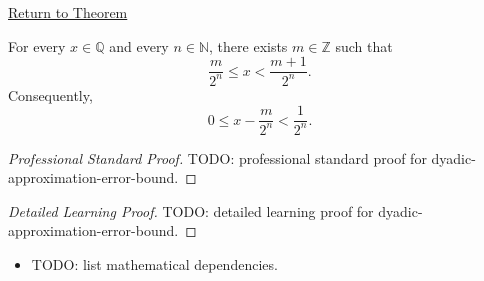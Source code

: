 \newpage
{}
\label{prf:dyadic-approximation-error-bound}

\begin{remark*}[Return]
\hyperref[thm:dyadic-approximation-error-bound]{Return to Theorem}
\end{remark*}

\begin{theorem*}
For every $x\in\mathbb{Q}$ and every $n\in\mathbb{N}$, there exists
$m\in\mathbb{Z}$ such that
\[
\frac{m}{2^n}\le x<\frac{m+1}{2^n}.
\]
Consequently,
\[
0\le x-\frac{m}{2^n}<\frac{1}{2^n}.
\]
\end{theorem*}

\begin{proof}[Professional Standard Proof]
\LRAProofBodyStart
TODO: professional standard proof for dyadic-approximation-error-bound.
\end{proof}

\begin{proof}[Detailed Learning Proof]
\LRAProofBodyStart
TODO: detailed learning proof for dyadic-approximation-error-bound.
\end{proof}

\begin{remark*}
\end{remark*}

\begin{dependencies}
\begin{itemize}
  \item TODO: list mathematical dependencies.
\end{itemize}
\end{dependencies}

\clearpage
